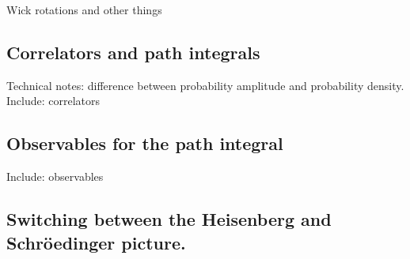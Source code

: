 Wick rotations and other things


\subsection{Correlators and path integrals}
Technical notes:
difference between probability amplitude and probability density.
Include: correlators

\subsection{Observables for the path integral}
Include: observables

\subsection{Switching between the Heisenberg and Schröedinger picture.}



